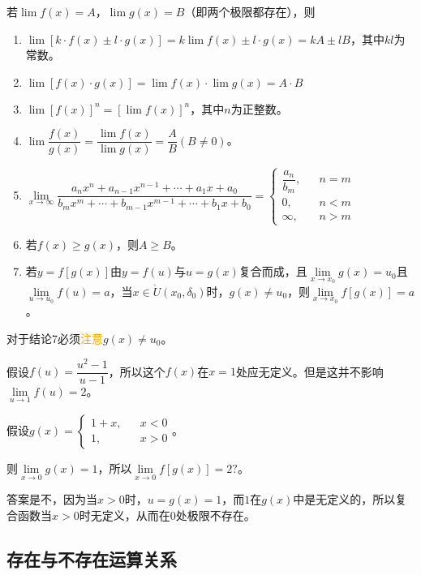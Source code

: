 \documentclass[UTF8, 12pt]{ctexart}
\begin{document}
        若$\lim f(x)=A$，$\lim g(x)=B$（即两个极限都存在），则

        \begin{enumerate}
            \item $\lim[k\cdot f(x)\pm l\cdot g(x)]=k\lim f(x)\pm l\cdot g(x)=kA\pm lB$，其中$kl$为常数。
            \item $\lim[f(x)\cdot g(x)]=\lim f(x)\cdot\lim g(x)=A\cdot B$
            \item $\lim[f(x)]^n=[\lim f(x)]^n$，其中$n$为正整数。
            \item $\lim\dfrac{f(x)}{g(x)}=\dfrac{\lim f(x)}{\lim g(x)}=\dfrac{A}{B}(B\neq 0)$。
            \item $\lim\limits_{x\to\infty}\dfrac{a_nx^n+a_{n-1}x^{n-1}+\cdots+a_1x+a_0}{b_mx^m+\cdots+b_{m-1}x^{m-1}+\cdots+b_1x+b_0}=\left\{
            \begin{array}{lcl}
                \dfrac{a_n}{b_m}, & & n=m \\
                0, & & n<m \\
                \infty, & & n>m
            \end{array}
            \right.$
            \item 若$f(x)\geqslant g(x)$，则$A\geqslant B$。
            \item 若$y=f[g(x)]$由$y=f(u)$与$u=g(x)$复合而成，且$\lim\limits_{x\to x_0}g(x)=u_0$且$\lim\limits_{u\to u_0}f(u)=a$，当$x\in\mathring{U}(x_0,\delta_0)$时，$g(x)\neq u_0$，则$\lim\limits_{x\to x_0}f[g(x)]=a$。
        \end{enumerate}

        对于结论7必须\textcolor{orange}{注意}$g(x)\neq u_0$。

        假设$f(u)=\dfrac{u^2-1}{u-1}$，所以这个$f(x)$在$x=1$处应无定义。但是这并不影响$\lim\limits_{u\to 1}f(u)=2$。

        假设$g(x)=\left\{
        \begin{array}{lcl}
            1+x, & & x<0 \\
            1, & & x>0
        \end{array}
        \right.$。

        则$\lim\limits_{x\to 0}g(x)=1$，所以$\lim\limits_{x\to 0}f[g(x)]=2?$。

        答案是不，因为当$x>0$时，$u=g(x)=1$，而$1$在$g(x)$中是无定义的，所以复合函数当$x>0$时无定义，从而在$0$处极限不存在。

        \subsection{存在与不存在运算关系}
\end{document}
